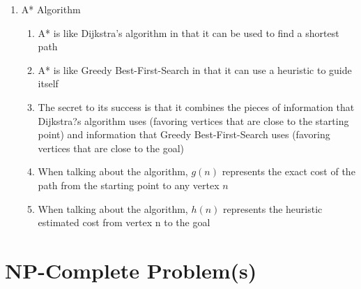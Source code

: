 \documentclass [12pt, executivepaper]{article}
\begin{document}
\begin{enumerate}
\begin{enumerate}
\begin{enumerate}
\end{enumerate}

\item A* Algorithm

\begin{enumerate}

\item A* is like Dijkstra's algorithm in that it can be used to find a shortest path

\item A* is like Greedy Best-First-Search in that it can use a heuristic to guide itself

\item The secret to its success is that it combines the pieces of information that Dijkstra?s algorithm uses (favoring vertices that are close to the starting point) and information that Greedy Best-First-Search uses (favoring vertices that are close to the goal)

\item When talking about the algorithm, $g(n)$ represents the exact cost of the path from the starting point to any vertex $n$

\item When talking about the algorithm, $h(n)$ represents the heuristic estimated cost from vertex n to the goal

\end{enumerate}

\end{enumerate}

\end{enumerate}

\section*{NP-Complete Problem(s)}
\end{document}
